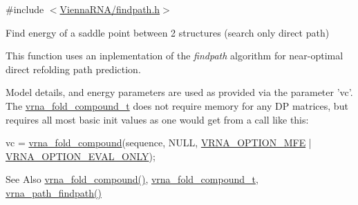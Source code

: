 {\ttfamily \#include $<$\hyperlink{findpath_8h}{Vienna\-R\-N\-A/findpath.\-h}$>$}



Find energy of a saddle point between 2 structures (search only direct path) 

This function uses an inplementation of the {\itshape findpath} algorithm \cite{flamm:2001} for near-\/optimal direct refolding path prediction.

Model details, and energy parameters are used as provided via the parameter 'vc'. The \hyperlink{group__fold__compound_ga1b0cef17fd40466cef5968eaeeff6166}{vrna\-\_\-fold\-\_\-compound\-\_\-t} does not require memory for any D\-P matrices, but requires all most basic init values as one would get from a call like this\-: 
\begin{DoxyCode}
vc = \hyperlink{group__fold__compound_ga6601d994ba32b11511b36f68b08403be}{vrna\_fold\_compound}(sequence, NULL, \hyperlink{group__fold__compound_gae63be9127fe7dcc1f9bb14f5bb1064ee}{VRNA\_OPTION\_MFE} | 
      \hyperlink{group__fold__compound_ga61469c423131552c8483229f8b6c7e0e}{VRNA\_OPTION\_EVAL\_ONLY});
\end{DoxyCode}


\begin{DoxySeeAlso}{See Also}
\hyperlink{group__fold__compound_ga6601d994ba32b11511b36f68b08403be}{vrna\-\_\-fold\-\_\-compound()}, \hyperlink{group__fold__compound_ga1b0cef17fd40466cef5968eaeeff6166}{vrna\-\_\-fold\-\_\-compound\-\_\-t}, \hyperlink{group__direct__paths_ga5e1f97f58adc65016a8df88802dc16b5}{vrna\-\_\-path\-\_\-findpath()}
\end{DoxySeeAlso}

